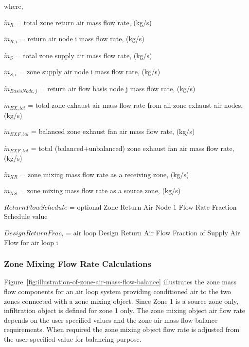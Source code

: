 where,

\({\dot m_{R}}\) = total zone return air mass flow rate, (kg/s)

\({\dot m_{R,i}}\) = return air node i mass flow rate, (kg/s)

\({\dot m_{S}}\) = total zone supply air mass flow rate, (kg/s)

\({\dot m_{S,i}}\) = zone supply air node i mass flow rate, (kg/s)

\({\dot m_{Basis Node,j}}\) = return air flow basis node j mass flow rate, (kg/s)

\({\dot m_{EX,tot}}\) = total zone exhaust air mass flow rate from all zone exhaust air nodes, (kg/s)

\({\dot m_{EXF,bal}}\) = balanced zone exhaust fan air mass flow rate, (kg/s)

\({\dot m_{EXF,tot}}\) = total (balanced+unbalanced) zone exhaust fan air mass flow rate, (kg/s)

\({\dot m_{XR}}\) = zone mixing mass flow rate as a receiving zone, (kg/s)

\({\dot m_{XS}}\) = zone mixing mass flow rate as a source zone, (kg/s)

\(ReturnFlowSchedule\) = optional Zone Return Air Node 1 Flow Rate Fraction Schedule value

\({DesignReturnFrac_i}\) = air loop Design Return Air Flow Fraction of Supply Air Flow for air loop i

\subsubsection{Zone Mixing Flow Rate Calculations}\label{zone-mixing-flow-rate-calculations}

Figure~\ref{fig:illustration-of-zone-air-mass-flow-balance} illustrates the zone mass flow components for an air loop system providing conditioned air to the two zones connected with a zone mixing object. Since Zone 1 is a source zone only, infiltration object is defined for zone 1 only. The zone mixing object air flow rate depends on the user specified values and the zone air mass flow balance requirements. When required the zone mixing object flow rate is adjusted from the user specified value for balancing purpose.

